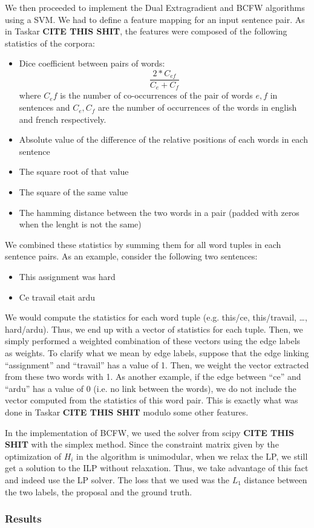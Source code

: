 We then proceeded to implement the Dual Extragradient and BCFW algorithms using
a SVM. We had to define a feature mapping for an input sentence pair. As in
Taskar \textbf{CITE THIS SHIT}, the features were composed of the following
statistics of the corpora:
\begin{itemize}
  \item Dice coefficient between pairs of words:
    \begin{equation*}
      \frac{2*C_{ef}}{C_e + C_f}
    \end{equation*}
    where $C_ef$ is the number of co-occurrences of the pair of words $e,f$ in
sentences and $C_e, C_f$ are the number of occurrences of the words in english
and french respectively.

  \item Absolute value of the difference of the relative positions of each words in each sentence

  \item The square root of that value

  \item The square of the same value

  \item The hamming distance between the two words in a pair (padded with zeros when the lenght is not the same)

\end{itemize}
We combined these statistics by summing them for all word tuples in each sentence pairs. As an example, consider the following two sentences:
\begin{itemize}
  \item This assignment was hard
  \item Ce travail etait ardu
\end{itemize}
We would compute the statistics for each word tuple (e.g. this/ce, this/travail,
\dots, hard/ardu). Thus, we end up with a vector of statistics for each tuple.
Then, we simply performed a weighted combination of these vectors using the edge
labels as weights. To clarify what we mean by edge labels, suppose that the edge
linking ``assignment'' and ``travail'' has a value of 1. Then, we weight the
vector extracted from these two words with 1. As another example, if the edge
between ``ce'' and ``ardu'' has a value of 0 (i.e. no link between the words),
we do not include the vector computed from the statistics of this word pair.
This is exactly what was done in Taskar \textbf{CITE THIS SHIT} modulo some
other features.

In the implementation of BCFW, we used the solver from scipy \textbf{CITE THIS
SHIT} with the simplex method. Since the constraint matrix given by the
optimization of $H_i$ in the algorithm is unimodular, when we relax the LP, we
still get a solution to the ILP without relaxation. Thus, we take advantage of
this fact and indeed use the LP solver. The loss that we used was the $L_1$
distance between the two labels, the proposal and the ground truth.

\subsubsection{Results}

